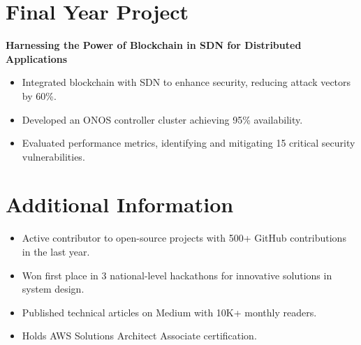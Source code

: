 \documentclass[a4paper,10pt]{article}
\begin{document}
\section*{Final Year Project}
\textbf{Harnessing the Power of Blockchain in SDN for Distributed Applications}
\begin{itemize}
    \item Integrated blockchain with SDN to enhance security, reducing attack vectors by 60\%.
    \item Developed an ONOS controller cluster achieving 95\% availability.
    \item Evaluated performance metrics, identifying and mitigating 15 critical security vulnerabilities.
\end{itemize}

\section*{Additional Information}
\begin{itemize}
    \item Active contributor to open-source projects with 500+ GitHub contributions in the last year.
    \item Won first place in 3 national-level hackathons for innovative solutions in system design.
    \item Published technical articles on Medium with 10K+ monthly readers.
    \item Holds AWS Solutions Architect Associate certification.
\end{itemize}
\end{document}
